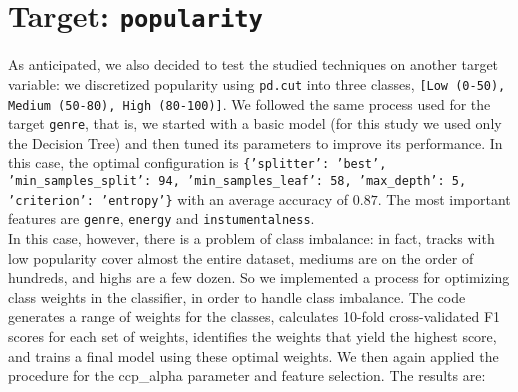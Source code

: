 \section{Target: \texttt{popularity}}
As anticipated, we also decided to test the studied techniques on another target variable: we discretized popularity using \texttt{pd.cut} into three classes, \texttt{[Low (0-50), Medium (50-80), High (80-100)]}. We followed the same process used for the target \texttt{genre}, that is, we started with a basic model (for this study we used only the Decision Tree) and then tuned its parameters to improve its performance. In this case, the optimal configuration is \texttt{\{'splitter': 'best', 'min\_samples\_split': 94, 'min\_samples\_leaf': 58, 'max\_depth': 5, 'criterion': 'entropy'\}} with an average accuracy of $0.87$. The most important features are \texttt{genre}, \texttt{energy} and \texttt{instumentalness}.\\ In this case, however, there is a problem of class imbalance: in fact, tracks with low popularity cover almost the entire dataset, mediums are on the order of hundreds, and highs are a few dozen. So we implemented a process for optimizing class weights in the classifier, in order to handle class imbalance. The code generates a range of weights for the classes, calculates 10-fold cross-validated F1 scores for each set of weights, identifies the weights that yield the highest score, and trains a final model using these optimal weights. We then again applied the procedure for the ccp\_alpha parameter and feature selection. The results are:
